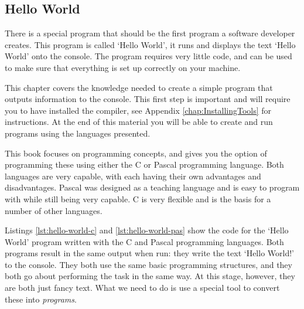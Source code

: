 \clearpage
\subsection{Hello World} %
\label{sub:hello world}

There is a special program that should be the first program a software developer creates. This program is called `Hello World', it runs and displays the text `Hello World' onto the console. The program requires very little code, and can be used to make sure that everything is set up correctly on your machine.

This chapter covers the knowledge needed to create a simple program that outputs information to the console. This first step is important and will require you to have installed the compiler, see Appendix \ref{chap:InstallingTools} for instructions. At the end of this material you will be able to create and run programs using the languages presented.

This book focuses on programming concepts, and gives you the option of programming these using either the C or Pascal programming language. Both languages are very capable, with each having their own advantages and disadvantages. Pascal was designed as a teaching language and is easy to program with while still being very capable. C is very flexible and is the basis for a number of other languages.

\begin{multicols}{2}
  \columnbreak
\end{multicols}

Listings \ref{lst:hello-world-c} and \ref{lst:hello-world-pas} show the code for the `Hello World' program written with the C and Pascal programming languages. Both programs result in the same output when run: they write the text `Hello World!' to the console. They both use the same basic programming structures, and they both go about performing the task in the same way. At this stage, however, they are both just fancy text. What we need to do is use a special tool to convert these into \emph{programs}.

